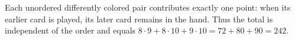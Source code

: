 Each unordered differently colored pair contributes exactly one point: when its earlier card is played, its later card remains in the hand. Thus the total is independent of the order and equals $8\cdot9+8\cdot10+9\cdot10=72+80+90=\boxed{242}$.

